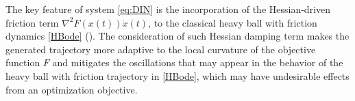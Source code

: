 \documentclass[reqno]{amsart}
\theoremstyle{plain}
\theoremstyle{definition}
\theoremstyle{remark}
\newcommand{\needref}{{\color{red}\upshape\textbf{[??]}}\xspace}	%
\newcommand{\ie}{i.e.,\xspace}	%
\begin{document}
The key feature of system \eqref{eq:DIN} is the incorporation of the Hessian-driven friction term $\nabla^{2}F(x(t))\dot{x}(t)$, to the classical heavy ball with friction dynamics \eqref{HBode} (\cite{polyak1964some,antipin1994minimization,alvarez2000minimizing,attouch2000heavy}).
The consideration of such Hessian damping term makes the generated trajectory more adaptive to the local curvature of the objective function $F$ and mitigates the oscillations that may appear in the behavior of the heavy ball with friction trajectory in \eqref{HBode}, which may have undesirable effects from an optimization objective.













\end{document}
